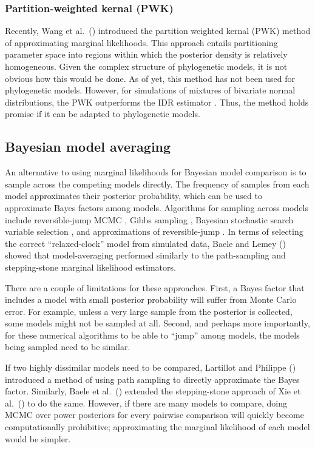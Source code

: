 \subsubsection{Partition-weighted kernal (PWK)}
Recently, Wang et al.\ (\citeyear{Wang2017}) introduced the partition weighted
kernal (PWK) method of approximating marginal likelihoods.
This approach entails partitioning parameter space into regions within which
the posterior density is relatively homogeneous.
Given the complex structure of phylogenetic models, it is not obvious how this
would be done.
As of yet, this method has not been used for phylogenetic models.
However, for simulations of mixtures of bivariate normal distributions, the
PWK outperforms the IDR estimator \citep{Wang2017}.
Thus, the method holds promise if it can be adapted to phylogenetic models.


\subsection{Bayesian model averaging}

An alternative to using marginal likelihoods for Bayesian model comparison is
to sample across the competing models directly.
The frequency of samples from each model approximates their posterior
probability, which can be used to approximate Bayes factors among models.
Algorithms for sampling across models include reversible-jump MCMC
\citep{Green1995}, Gibbs sampling \citep{Neal2000}, Bayesian stochastic search
variable selection \citep{George1993,Kuo1998}, and approximations of reversible-jump
\citep{Jones2015}.
In terms of selecting the correct ``relaxed-clock'' model from simulated data,
Baele and Lemey (\citeyear{Baele2014}) showed that model-averaging performed
similarly to the path-sampling and stepping-stone marginal likelihood
estimators.

There are a couple of limitations for these approaches.
First, a Bayes factor that includes a model with small posterior probability
will suffer from Monte Carlo error.
For example, unless a very large sample from the posterior is collected, some
models might not be sampled at all.
Second, and perhaps more importantly, for these numerical algorithms to be able
to ``jump'' among models, the models being sampled need to be similar.

If two highly dissimilar models need to be compared,
Lartillot and Philippe (\citeyear{Lartillot2006}) introduced a method of using
path sampling to directly approximate the Bayes factor.
Similarly, Baele et al.\ (\citeyear{Baele2013}) extended the stepping-stone
approach of Xie et al.\ (\citeyear{Xie2011}) to do the same.
However, if there are many models to compare, doing MCMC over power posteriors
for every pairwise comparison will quickly become computationally prohibitive;
approximating the marginal likelihood of each model would be simpler.

